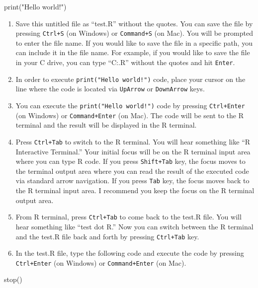 \documentclass[
  letterpaper,
  DIV=11,
  numbers=noendperiod]{scrartcl}
\newenvironment{Shaded}{\begin{snugshade}}{\end{snugshade}}
\newcommand{\FunctionTok}[1]{\textcolor[rgb]{0.28,0.35,0.67}{#1}}
\newcommand{\NormalTok}[1]{\textcolor[rgb]{0.00,0.23,0.31}{#1}}
\newcommand{\StringTok}[1]{\textcolor[rgb]{0.13,0.47,0.30}{#1}}
\begin{document}
\begin{Shaded}
\begin{Highlighting}[]
\FunctionTok{print}\NormalTok{(}\StringTok{"Hello world!"}\NormalTok{)}
\end{Highlighting}
\end{Shaded}

\begin{enumerate}
\def\labelenumi{\arabic{enumi}.}
\setcounter{enumi}{3}
\item
  Save this untitled file as ``test.R'' without the quotes. You can save
  the file by pressing \texttt{Ctrl+S} (on Windows) or
  \texttt{Command+S} (on Mac). You will be prompted to enter the file
  name. If you would like to save the file in a specific path, you can
  include it in the file name. For example, if you would like to save
  the file in your C drive, you can type ``C:\test.R'' without the
  quotes and hit \texttt{Enter}.
\item
  In order to execute \texttt{print("Hello\ world!")} code, place your
  cursor on the line where the code is located via \texttt{UpArrow} or
  \texttt{DownArrow} keys.
\item
  You can execute the \texttt{print("Hello\ world!")} code by pressing
  \texttt{Ctrl+Enter} (on Windows) or \texttt{Command+Enter} (on Mac).
  The code will be sent to the R terminal and the result will be
  displayed in the R terminal.
\item
  Press \texttt{Ctrl+Tab} to switch to the R terminal. You will hear
  something like ``R Interactive Terminal.'' Your initial focus will be
  on the R terminal input area where you can type R code. If you press
  \texttt{Shift+Tab} key, the focus moves to the terminal output area
  where you can read the result of the executed code via standard arrow
  navigation. If you press \texttt{Tab} key, the focus moves back to the
  R terminal input area. I recommend you keep the focus on the R
  terminal output area.
\item
  From R terminal, press \texttt{Ctrl+Tab} to come back to the test.R
  file. You will hear something like ``test dot R.'' Now you can switch
  between the R terminal and the test.R file back and forth by pressing
  \texttt{Ctrl+Tab} key.
\item
  In the test.R file, type the following code and execute the code by
  pressing \texttt{Ctrl+Enter} (on Windows) or \texttt{Command+Enter}
  (on Mac).
\end{enumerate}

\begin{Shaded}
\begin{Highlighting}[]
\FunctionTok{stop}\NormalTok{()}
\end{Highlighting}
\end{Shaded}
\end{document}
